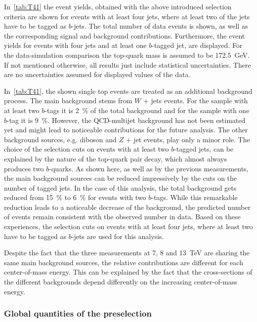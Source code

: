 In~\cref{tab:T41} the event yields, obtained with the above introduced selection criteria are shown for events with at least four jets, where at least two of the jets have to be tagged as $b$-jets. The total number of data events is shown, as well as the corresponding signal and background contributions. Furthermore, the event yields for events with four jets and at least one $b$-tagged jet, are displayed. 
For the data-simulation comparison the top-quark mass is assumed to be 172.5~GeV. If not mentioned otherwise, all results just include statistical uncertainties. There are no uncertainties assumed for displayed values of the data. 

In~\cref{tab:T41}, the shown single top events are treated as an additional background process.
The main background stems from $W$ + jets events. For the sample with at least two $b$-tags it is  2~\% of the total background and for the sample with one $b$-tag it is 9~\%. However, the QCD-multijet background has not been estimated yet and might lead to noticeable contributions for the future analysis. The other background sources, e.g.  diboson  and $Z$ + jet events, play only a minor role. 
The choice of the selection cuts on events with at least two $b$-tagged jets, can be explained by the nature of the top-quark pair decay, which almost always produces two $b$-quarks.  As shown here, as well as by the previous measurements, the main background sources can be reduced impressively by the cuts on the number of tagged jets. In the  case of this analysis, the total background gets reduced from  15~\% to 6~\% for events with two  $b$-tags. While this remarkable reduction leads to a noticeable decrease of the background, the predicted number of events remain consistent with the observed number in data. Based on these experiences, the selection cuts on events with at least four jets, where at least two have to be tagged as $b$-jets are used for this analysis.

Despite the fact that the three measurements at 7, 8 and 13~TeV are sharing the same main background sources, the relative contributions are different for each center-of-mass energy. This can be explained by the fact that the cross-sections of the different backgrounds depend differently on the increasing center-of-mass energy.
\vspace{0.5cm}

\vspace{1.0cm}

\subsubsection{Global quantities of the preselection}

